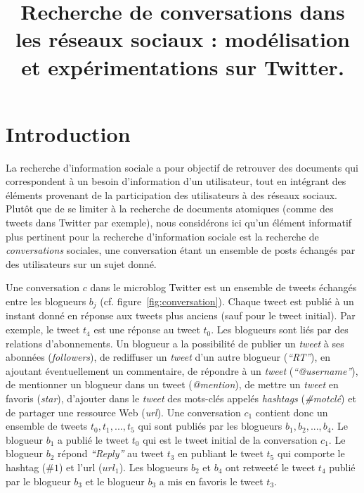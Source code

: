\documentclass{article-hermes}
\title[$  $]{Recherche de conversations dans les réseaux sociaux : 
modélisation et expérimentations sur Twitter.}
\author{
}
\begin{document}
  
\maketitlepage

\newcommand{\fakesentence}{Attention à ce que les figures et les tableaux ne débordent pas dans les marges. }
\newcommand{\fakeparagraph}{
\fakesentence
\fakesentence
\fakesentence
\fakesentence
\fakesentence
\fakesentence
}

\section{Introduction}

La recherche d'information sociale a pour objectif de retrouver des documents qui correspondent à un besoin d'information d'un utilisateur, tout en intégrant des éléments provenant de la participation des utilisateurs à des réseaux sociaux. Plutôt que de se limiter à la recherche de documents atomiques (comme des tweets dans Twitter par exemple), nous considérons ici qu'un élément informatif plus pertinent pour la recherche d'information sociale est la recherche de {\it conversations} sociales, une conversation étant un ensemble de posts échangés par des utilisateurs sur un sujet donné. 

\label{sec:convtw}
Une conversation $c$ dans le microblog Twitter est un ensemble de tweets échangés entre les blogueurs $b_j$ (cf. figure~\ref{fig:conversation}). Chaque tweet est publié à un instant donné en réponse aux tweets plus anciens (sauf pour le tweet initial). Par exemple, le tweet $t_4$ est une réponse au tweet $t_0$. Les blogueurs sont liés par des relations d'abonnements. Un blogueur a la possibilité de publier un \textit{tweet} à ses abonnées (\textit{followers}), de rediffuser un \textit{tweet} d'un autre blogueur (\textit{``RT''}), en ajoutant éventuellement un commentaire, de répondre à un \textit{tweet} (\textit{``@username''}), de mentionner un blogueur dans un tweet (\textit{@mention}), de mettre un \textit{tweet} en favoris (\textit{star}), d'ajouter dans le \textit{tweet} des mots-clés appelés \textit{hashtags} (\textit{\#motclé}) et de partager une ressource Web (\textit{url}). Une conversation $c_1$ contient donc un ensemble de tweets $t_0, t_1, ..., t_5$ qui sont publiés par les blogueurs $b_1,b_2,...,b_4$. Le blogueur $b_1$ a publié le tweet $t_0$ qui est le tweet initial de la conversation $c_1$. Le blogueur $b_2$ répond \textit{``Reply''} au tweet $t_3$ en publiant le tweet $t_5$ qui comporte le hashtag ($\#1$) et l'url ($url_1$). Les blogueurs $b_2$ et $b_4$ ont retweeté le tweet $t_4$ publié par le blogueur $b_3$ et le blogueur $b_3$ a mis en favoris le tweet $t_3$.
\end{document}

